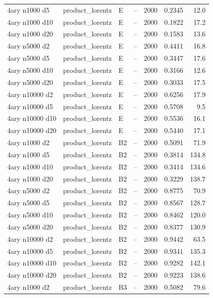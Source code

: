 \begin{longtable}{llllrrr}
4ary n1000 d5 & product\_lorentz & E & -- & 2000 & 0.2345 & 12.0 \\
4ary n1000 d10 & product\_lorentz & E & -- & 2000 & 0.1822 & 17.2 \\
4ary n1000 d20 & product\_lorentz & E & -- & 2000 & 0.1583 & 13.6 \\
4ary n5000 d2 & product\_lorentz & E & -- & 2000 & 0.4411 & 16.8 \\
4ary n5000 d5 & product\_lorentz & E & -- & 2000 & 0.3447 & 17.6 \\
4ary n5000 d10 & product\_lorentz & E & -- & 2000 & 0.3166 & 12.6 \\
4ary n5000 d20 & product\_lorentz & E & -- & 2000 & 0.3033 & 17.5 \\
4ary n10000 d2 & product\_lorentz & E & -- & 2000 & 0.6256 & 17.9 \\
4ary n10000 d5 & product\_lorentz & E & -- & 2000 & 0.5708 & 9.5 \\
4ary n10000 d10 & product\_lorentz & E & -- & 2000 & 0.5536 & 16.1 \\
4ary n10000 d20 & product\_lorentz & E & -- & 2000 & 0.5440 & 17.1 \\
4ary n1000 d2 & product\_lorentz & B2 & -- & 2000 & 0.5091 & 71.9 \\
4ary n1000 d5 & product\_lorentz & B2 & -- & 2000 & 0.3814 & 134.8 \\
4ary n1000 d10 & product\_lorentz & B2 & -- & 2000 & 0.3414 & 134.6 \\
4ary n1000 d20 & product\_lorentz & B2 & -- & 2000 & 0.3229 & 138.7 \\
4ary n5000 d2 & product\_lorentz & B2 & -- & 2000 & 0.8775 & 70.9 \\
4ary n5000 d5 & product\_lorentz & B2 & -- & 2000 & 0.8567 & 128.7 \\
4ary n5000 d10 & product\_lorentz & B2 & -- & 2000 & 0.8462 & 120.0 \\
4ary n5000 d20 & product\_lorentz & B2 & -- & 2000 & 0.8377 & 130.9 \\
4ary n10000 d2 & product\_lorentz & B2 & -- & 2000 & 0.9442 & 63.5 \\
4ary n10000 d5 & product\_lorentz & B2 & -- & 2000 & 0.9341 & 135.3 \\
4ary n10000 d10 & product\_lorentz & B2 & -- & 2000 & 0.9282 & 142.1 \\
4ary n10000 d20 & product\_lorentz & B2 & -- & 2000 & 0.9223 & 138.6 \\
4ary n1000 d2 & product\_lorentz & B3 & -- & 2000 & 0.5082 & 79.6 \\

\end{longtable}
